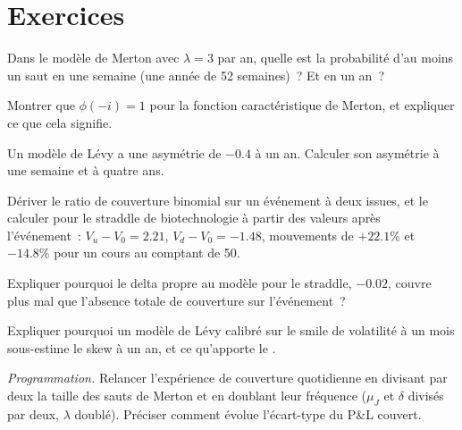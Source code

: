 \section{Exercices}

\begin{exercise}[$\star$]\label{exo:dv:jumps-and-levy-models:1}
Dans le modèle de Merton avec $\lambda=3$ par an, quelle est la probabilité d'au moins un saut en une semaine (une année de 52
semaines)~? Et en un an~?
\end{exercise}

\begin{exercise}[$\star$]\label{exo:dv:jumps-and-levy-models:2}
Montrer que $\phi(-i)=1$ pour la fonction caractéristique de Merton, et expliquer ce que cela signifie.
\end{exercise}

\begin{exercise}[$\star$]\label{exo:dv:jumps-and-levy-models:3}
Un modèle de Lévy a une asymétrie de $-0.4$ à un an. Calculer son asymétrie à une semaine et à quatre ans.
\end{exercise}

\begin{exercise}[$\star\star$]\label{exo:dv:jumps-and-levy-models:4}
Dériver le ratio de couverture binomial sur un événement à deux issues, et le calculer pour le straddle de biotechnologie à partir des
valeurs après l'événement~: $V_u-V_0=2.21$, $V_d-V_0=-1.48$, mouvements de $+22.1\%$ et $-14.8\%$ pour un cours au comptant de 50.
\end{exercise}

\begin{exercise}[$\star\star$]\label{exo:dv:jumps-and-levy-models:5}
Expliquer pourquoi le delta propre au modèle pour le straddle, $-0.02$, couvre plus mal que l'absence totale de couverture sur l'événement~?
\end{exercise}

\begin{exercise}[$\star\star$]\label{exo:dv:jumps-and-levy-models:6}
Expliquer pourquoi un modèle de Lévy calibré sur le smile de volatilité à un mois sous-estime le skew à un an, et ce qu'apporte le .
\end{exercise}

\begin{exercise}[$\star\star\star$]\label{exo:dv:jumps-and-levy-models:7}
\emph{Programmation.} Relancer l'expérience de couverture quotidienne en divisant par deux la taille des sauts de Merton et en doublant leur fréquence
($\mu_J$ et $\delta$ divisés par deux, $\lambda$ doublé). Préciser comment évolue l'écart-type du P\&L couvert.
\end{exercise}

